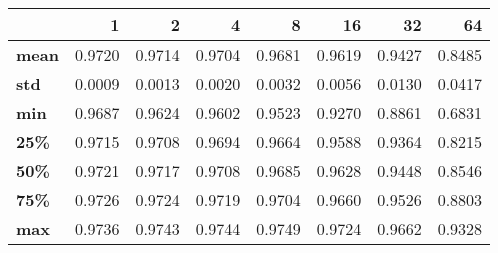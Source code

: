 \begin{tabular}{lrrrrrrr}
\toprule
{} &      1  &      2  &      4  &      8  &      16 &      32 &      64 \\
\midrule
\textbf{mean} &  0.9720 &  0.9714 &  0.9704 &  0.9681 &  0.9619 &  0.9427 &  0.8485 \\
\textbf{std } &  0.0009 &  0.0013 &  0.0020 &  0.0032 &  0.0056 &  0.0130 &  0.0417 \\
\textbf{min } &  0.9687 &  0.9624 &  0.9602 &  0.9523 &  0.9270 &  0.8861 &  0.6831 \\
\textbf{25\% } &  0.9715 &  0.9708 &  0.9694 &  0.9664 &  0.9588 &  0.9364 &  0.8215 \\
\textbf{50\% } &  0.9721 &  0.9717 &  0.9708 &  0.9685 &  0.9628 &  0.9448 &  0.8546 \\
\textbf{75\% } &  0.9726 &  0.9724 &  0.9719 &  0.9704 &  0.9660 &  0.9526 &  0.8803 \\
\textbf{max } &  0.9736 &  0.9743 &  0.9744 &  0.9749 &  0.9724 &  0.9662 &  0.9328 \\
\bottomrule
\end{tabular}
